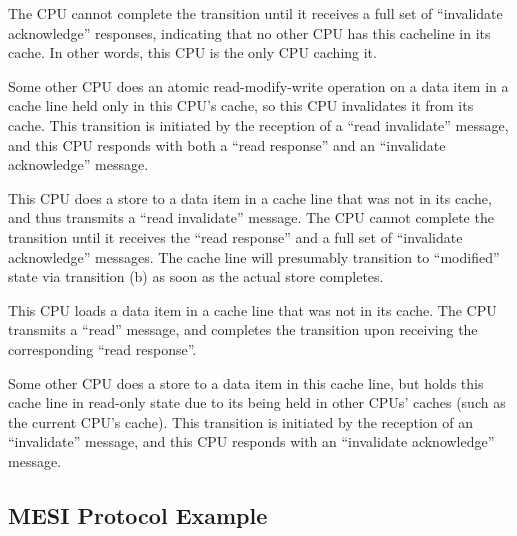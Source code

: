\begin{description}[style=nextline]
	The CPU cannot complete the transition until it receives a full
	set of ``invalidate acknowledge'' responses, indicating that
	no other CPU has this cacheline in its cache.
	In other words, this CPU is the only CPU caching it.
\item	[Transition (i):]
	Some other CPU does an atomic read-modify-write operation on
	a data item in a cache line held only in this CPU's cache,
	so this CPU invalidates it from its cache.
	This transition is initiated by the reception of a ``read invalidate''
	message, and this CPU responds with both a ``read response''
	and an ``invalidate acknowledge'' message.
\item	[Transition (j):]
	This CPU does a store to a data item in a cache line that was not
	in its cache, and thus transmits a ``read invalidate'' message.
	The CPU cannot complete the transition until it receives the
	``read response'' and a full set of ``invalidate acknowledge''
	messages.
	The cache line will presumably transition to ``modified'' state via
	transition (b) as soon as the actual store completes.
\item	[Transition (k):]
	This CPU loads a data item in a cache line that was not
	in its cache.
	The CPU transmits a ``read'' message, and completes the
	transition upon receiving the corresponding ``read response''.
\item	[Transition (l):]
	Some other CPU does a store to
	a data item in this cache line, but holds this cache line in read-only
	state due to its being held in other CPUs' caches (such as the
	current CPU's cache).
	This transition is initiated by the reception of an ``invalidate''
	message, and this CPU responds with
	an ``invalidate acknowledge'' message.
\end{description}

\QuickQuizEnd

\subsection{MESI Protocol Example}
\label{sec:app:whymb:MESI Protocol Example}

